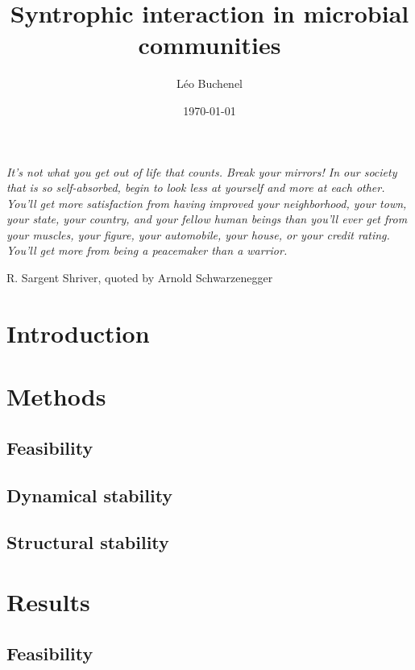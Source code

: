 \documentclass[12pt, titlepage, twoside, openright]{report}
\begin{document}
  \title{Syntrophic interaction in microbial communities}
  \author{L\'eo Buchenel}
  \date{\today}
  \maketitle
  \thispagestyle{empty}
  \vspace*{\fill}
  \epigraph{\itshape It's not what you get out of life that counts. Break your mirrors! In our society that is so self-absorbed, begin to look less at yourself and more at each other. You'll get more satisfaction from having improved your neighborhood, your town, your state, your country, and your fellow human beings than you'll ever get from your muscles, your figure, your automobile, your house, or your credit rating. You'll get more from being a peacemaker than a warrior.}{R. Sargent Shriver, quoted by Arnold Schwarzenegger}
  \vspace*{\fill}
  \tableofcontents
  \chapter{Introduction}
  

  \chapter{Methods}\label{chap : methods}
  \section{Feasibility}\label{sec : methods feasibility}
  
  \FloatBarrier
  \newpage
  \section{Dynamical stability}\label{sec : methods dynamical stability}
  
  \FloatBarrier
  \newpage
  \section{Structural stability}
  
  \FloatBarrier
  \chapter{Results}\label{chapter : results}
  
  \section{Feasibility}
  
  \FloatBarrier
  \newpage
\end{document}
